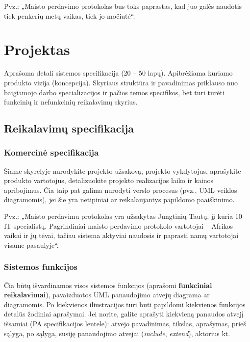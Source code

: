 \documentclass{ktuthesis}
\begin{document}
  Pvz.: „Maisto perdavimo protokolas bus toks paprastas, kad juo galės naudotis tiek penkerių metų vaikas, tiek jo močiutė“.

  \section{Projektas}

  Aprašoma detali sistemos specifikacija (20 – 50 lapų). Apibrėžiama kuriamo produkto vizija (koncepcija). Skyriaus struktūra ir pavadinimas priklauso nuo baigiamojo
  darbo specializacijos ir pačios temos specifikos, bet turi turėti funkcinių ir nefunkcinių reikalavimų skyrius.

  \subsection{Reikalavimų specifikacija}

  \subsubsection{Komercinė specifikacija}

  Šiame skyrelyje nurodykite projekto užsakovą, projekto vykdytojus, aprašykite produkto vartotojus, detalizuokite projekto realizacijos laiko ir kainos apribojimus.
  Čia taip pat galima nurodyti verslo procesus (pvz., UML veiklos diagramomis), jei šie yra netipiniai ar reikalaujantys papildomo paaiškinimo.

  Pvz.: „Maisto perdavimu protokolas yra užsakytas Jungtinių Tautų, jį kuria 10 IT specialistų. Pagrindiniai maisto perdavimo protokolo vartotojai – Afrikos vaikai
  ir jų tėvai, tačiau sistema aktyviai naudosis ir paprasti namų vartotojai visame pasaulyje“.

  \subsubsection{Sistemos funkcijos}
  Čia būtų išvardinamos visos sistemos funkcijos (aprašomi \textbf{funkciniai reikalavimai}), pavaizduotos UML panaudojimo atvejų diagrama ar diagramomis. Po kiekvienos
  iliustracijos turi būti papildomi kiekvienos funkcijos detalūs žodiniai aprašymai. Jei norite, galite aprašyti kiekvieną panaudos atvejį išsamiai
  (PA specifikacijos lentele): atvejo pavadinimas, tikslas, aprašymas, prieš sąlyga, po sąlyga, susiję panaudojimo atvejai (\textit{include}, \textit{extend}), aktorius kt.
\end{document}
